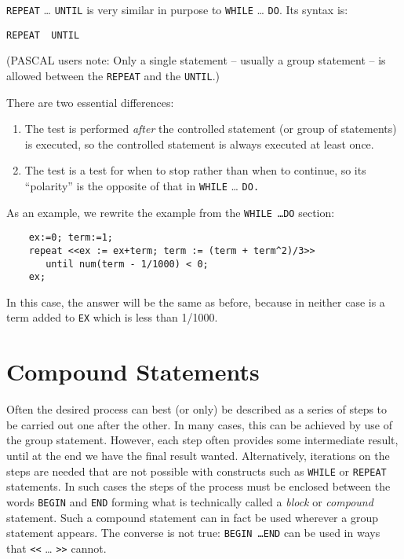 \texttt{REPEAT} \ldots{} \texttt{UNTIL} is very similar
in purpose to \texttt{WHILE} \ldots{} \texttt{DO}.  Its syntax is:
\begin{syntax}
  \texttt{REPEAT }\texttt{ UNTIL }
\end{syntax}
(PASCAL users note: Only a single statement -- usually a group statement
-- is allowed between the \texttt{REPEAT} and the \texttt{UNTIL}.)

There are two essential differences:
\begin{enumerate}
\item The test is performed \emph{after} the controlled statement (or group of
statements) is executed, so the controlled statement is always executed at
least once.

\item The test is a test for when to stop rather than when to continue, so its
``polarity'' is the opposite of that in \texttt{WHILE} \ldots{} \texttt{DO.}
\end{enumerate}

As an example, we rewrite the example from the \texttt{WHILE \ldots DO} section:
\begin{samepage}
\begin{verbatim}
    ex:=0; term:=1;
    repeat <<ex := ex+term; term := (term + term^2)/3>>
       until num(term - 1/1000) < 0;
    ex;
\end{verbatim}
\end{samepage}
In this case, the answer will be the same as before, because in neither
case is a term added to \texttt{EX} which is less than 1/1000.

\section{Compound Statements}
\hypertarget{command:BEGIN}{}

Often the desired process
can best (or only) be
described as a series of steps to be carried out one after the other.  In
many cases, this can be achieved by use of the group statement.  However, each step often provides some intermediate
result, until at the end we have the final result wanted.  Alternatively,
iterations on the steps are needed that are not possible with constructs
such as \texttt{WHILE} or \texttt{REPEAT}
statements.  In such cases the steps of the process must be
enclosed between the words \texttt{BEGIN} and \texttt{END} forming what is technically called a \emph{block} or
\emph{compound} statement.  Such a compound statement can in fact be used
wherever a group statement appears.  The converse is not true: {\tt BEGIN
\ldots END} can be used in ways
that \texttt{<}\texttt{<} \ldots{} \texttt{>}\texttt{>} cannot.

